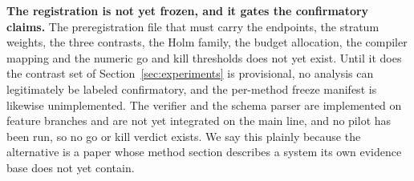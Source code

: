 \textbf{The registration is not yet frozen, and it gates the confirmatory
claims.} The preregistration file that must carry the endpoints, the stratum
weights, the three contrasts, the Holm family, the budget allocation, the
compiler mapping and the numeric go and kill thresholds does not yet exist. Until
it does the contrast set of Section~\ref{sec:experiments} is provisional, no
analysis can legitimately be labeled confirmatory, and the per-method freeze
manifest is likewise unimplemented. The verifier and the schema parser are
implemented on feature branches and are not yet integrated on the main line, and
no pilot has been run, so no go or kill verdict exists. We say this plainly
because the alternative is a paper whose method section describes a system its
own evidence base does not yet contain. 
